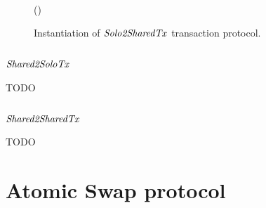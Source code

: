 \begin{figure}
\begin{center}
{\begin{varwidth}{\textwidth}
{            \varSigAlice \opFunResult {} \< \< \\
            \varSigFin \opFunResult \procFinSig{\varSigAlice}{\varSigBob} \< \< \\
            \varExcess \opAssign {} \opAddPoint {} \< \< \\
            \scriptstyle \pcreturn \varTx \opAssign \varTx \opUnion (\varExcess \opSeperate \varSigFin \opSeperate \varProof)
            }
        \end{varwidth}
        }
    \end{center}
    \caption{Instantiation of $\mathit{Solo2SharedTx}$ transaction protocol. \label{fig:So2MuTx}}
\end{figure}

\subsection{$\mathit{Shared2SoloTx}$}

TODO

\subsection{$\mathit{Shared2SharedTx}$}

TODO

\section{Atomic Swap protocol}\label{sec:atomic-swap}